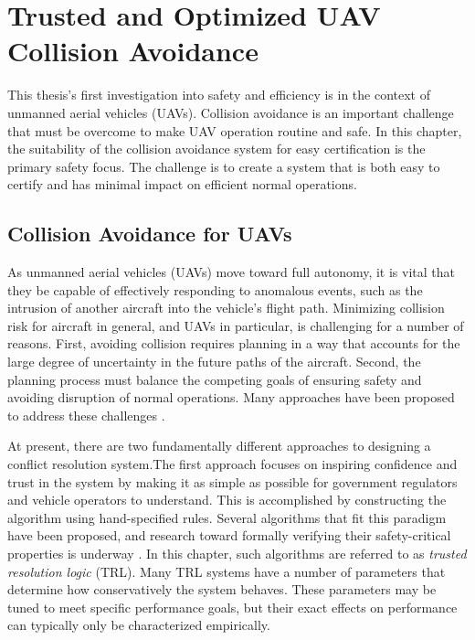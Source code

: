 \chapter{Trusted and Optimized UAV Collision Avoidance} \label{chap:uav}

This thesis's first investigation into safety and efficiency is in the context of unmanned aerial vehicles (UAVs).
Collision avoidance is an important challenge that must be overcome to make UAV operation routine and safe.
In this chapter,  the suitability of the collision avoidance system for easy certification is the primary safety focus.
The challenge is to create a system that is both easy to certify and has minimal impact on efficient normal operations.


\section{Collision Avoidance for UAVs} \label{sec:uavintro}

As unmanned aerial vehicles (UAVs) move toward full autonomy, it is vital that they be capable of effectively responding to anomalous events, such as the intrusion of another aircraft into the vehicle's flight path. Minimizing collision risk for aircraft in general, and UAVs in particular, is challenging for a number of reasons. First, avoiding collision requires planning in a way that accounts for the large degree of uncertainty in the future paths of the aircraft. Second, the planning process must balance the competing goals of ensuring safety and avoiding disruption of normal operations. Many approaches have been proposed to address these challenges \cite{JKK-LCY:00,HYO-MJK:15,RB-CF-HE:09,GH-RB-JM:11,HH-JJ-CM:10,AN-CM-GD:12,ST-MJK-LPK-TLP-JKK:10,MJK-JPC:11,MJK-JPC-LPK-TL:10,LPK-TL:09,HB-DH-MJK-WSL:12,JEH-MJK-WAO:13,EJR:14}.

At present, there are two fundamentally different approaches to designing a conflict resolution system.The first approach focuses on inspiring confidence and trust in the system by making it as simple as possible for government regulators and vehicle operators to understand.
This is accomplished by constructing the algorithm using hand-specified rules.
Several algorithms that fit this paradigm have been proposed, and research toward formally verifying their safety-critical properties is underway \cite{RB-CF-HE:09,GH-RB-JM:11,HH-JJ-CM:10,AN-CM-GD:12}.  In this chapter, such algorithms are referred to as \emph{trusted resolution logic} (TRL).
Many TRL systems have a number of parameters that determine how conservatively the system behaves.
These parameters may be tuned to meet specific performance goals, but their exact effects on performance can typically only be characterized empirically.

